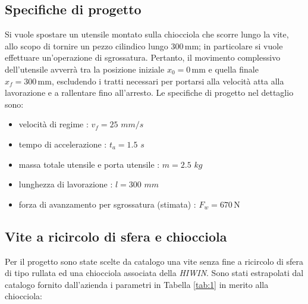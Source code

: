 \documentclass{article}
\begin{document}
\subsection{Specifiche di progetto}
\label{specifiche}
Si vuole spostare un utensile montato sulla chiocciola che scorre lungo la vite, allo scopo di tornire un pezzo cilindico lungo \(300\,\text{mm}\); in particolare si vuole effettuare un'operazione di sgrossatura. 
Pertanto, il movimento complessivo dell'utensile avverrà tra la posizione iniziale \(x_0 = 0\,\text{mm}\) e quella finale \(x_f = 300\,\text{mm}\), escludendo i tratti necessari per portarsi alla velocità atta alla lavorazione e a rallentare fino all’arresto. Le specifiche di progetto nel dettaglio sono:
\begin{itemize}
    \item velocità di regime : \begin{math} v_{f} = 25 \end{math} \begin{math} mm/s\end{math}
    \item tempo di accelerazione : \begin{math} t_{a} = 1.5 \end{math} \begin{math} s\end{math}
    \item massa totale utensile e porta utensile : \begin{math} m = 2.5 \end{math} \begin{math} kg\end{math}
    \item lunghezza di lavorazione : \begin{math} l = 300\end{math} \begin{math} 
    mm\end{math}
    \item forza di avanzamento per sgrossatura (stimata) : $F_{w}=670\,\mathrm{N}$
    
    
\end{itemize}
\vspace{0.5cm}
\subsection{Vite a ricircolo di sfera e chiocciola}
Per il progetto sono state scelte da catalogo una vite senza fine a ricircolo di sfera di tipo rullata ed una chiocciola associata della \textit{HIWIN}. 
Sono stati estrapolati dal catalogo fornito dall'azienda i parametri in Tabella \ref{tab:1} in merito alla chiocciola:
\end{document}
